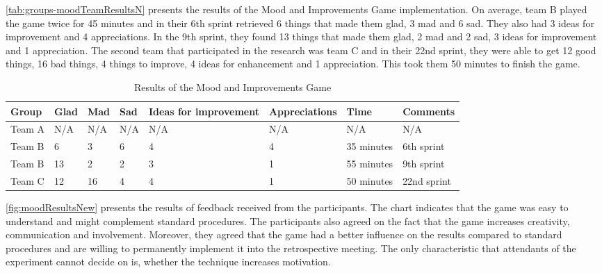 \autoref{tab:groups-moodTeamResultsN} presents the results of the Mood and Improvements Game implementation. On average, team B played the game twice for 45 minutes and in their 6th sprint retrieved 6 things that made them glad, 3 mad and 6 sad. They also had 3 ideas for improvement and 4 appreciations. In the 9th sprint, they found 13 things that made them glad, 2 mad and 2 sad, 3 ideas for improvement and 1 appreciation. The second team that participated in the research was team C and in their 22nd sprint, they were able to get 12 good things, 16 bad things, 4 things to improve, 4 ideas for enhancement and 1 appreciation. This took them 50 minutes to finish the game.

\begin{table}[!htbp]
	\caption{Results of the Mood and Improvements Game}
	\label{tab:groups-moodTeamResultsN}
	\begin{tabularx}{\textwidth}{|X|X|X|X|X|X|X|X|}
	\hline
		Group & Glad & Mad & Sad & Ideas for improvement & Appreciations & Time & Comments\\ \hline
		Team A & N/A & N/A & N/A & N/A & N/A & N/A & N/A \\ \hline
		Team B & 6 & 3 & 6 & 4 & 4 & 35 minutes & 6th sprint \\ \hline
		Team B & 13 & 2 & 2 & 3 & 1 & 55 minutes & 9th sprint \\ \hline
		Team C & 12 & 16 & 4 & 4 & 1 & 50 minutes & 22nd sprint\\ \hline
	\end{tabularx}
\end{table}

\autoref{fig:moodResultsNew} presents the results of feedback received from the participants. The chart indicates that the game was easy to understand and might complement standard procedures. The participants also agreed on the fact that the game increases creativity, communication and involvement. Moreover, they agreed that the game had a better influence on the results compared to standard procedures and are willing to permanently implement it into the retrospective meeting. The only characteristic that attendants of the experiment cannot decide on is, whether the technique increases motivation.

